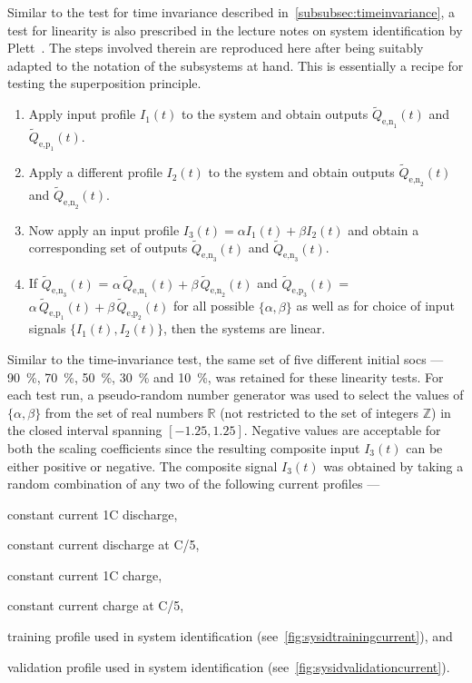 Similar     to      the     test      for     time      invariance     described
in~\cref{subsubsec:timeinvariance}, a  test for linearity is  also prescribed in
the lecture notes on  system identification by Plett~\cite{PlettECE5560_02}. The
steps involved therein  are reproduced here after being suitably  adapted to the
notation of the subsystems at hand. This is essentially a recipe for testing the
superposition principle.
\begin{enumerate}
    \item Apply input profile $I_1(t)$ to the system and obtain outputs $\widetilde{Q}_{\text{e,n}_1}\!(t)$ and $\widetilde{Q}_{\text{e,p}_1}\!(t)$.
    \item Apply a different profile $I_2(t)$ to the system and obtain outputs $\widetilde{Q}_{\text{e,n}_2}\!(t)$ and $\widetilde{Q}_{\text{e,n}_2}\!(t)$.
    \item Now apply an input profile $I_3(t) = \alpha I_1(t) + \beta I_2(t)$ and obtain a corresponding set of outputs $\widetilde{Q}_{\text{e,n}_3}\!(t)$ and $\widetilde{Q}_{\text{e,n}_3}\!(t)$.
    \item If $\widetilde{Q}_{\text{e,n}_3}\!(t)$ = $\alpha\, \widetilde{Q}_{\text{e,n}_1}\!(t) + \beta \, \widetilde{Q}_{\text{e,n}_2}\!(t)$ and $\widetilde{Q}_{\text{e,p}_3}\!(t)$ = $\alpha\, \widetilde{Q}_{\text{e,p}_1}\!(t) + \beta \, \widetilde{Q}_{\text{e,p}_2}\!(t)$ for all possible $\{\alpha,\beta\}$ as well as for choice of input signals $\{I_1(t),I_2(t)\}$, then the systems are linear.
\end{enumerate}

Similar  to   the  time-invariance  test,   the  same  set  of   five  different
initial \glspl{soc} --- \SI{90}{\percent}, \SI{70}{\percent}, \SI{50}{\percent},
\SI{30}{\percent} and \SI{10}{\percent}, was retained for these linearity tests.
For  each test  run, a  pseudo-random number  generator was  used to  select the
values  of $\{\alpha,\beta\}$  from the  set of  real numbers  $\mathbb{R}$ (not
restricted to the set of integers  $\mathbb{Z}$) in the closed interval spanning
$[-1.25,1.25]$. Negative values are acceptable for both the scaling coefficients
since the resulting composite input $I_3(t)$ can be either positive or negative.
The composite  signal $I_3(t)$ was  obtained by taking  a random combination of
any two of the following current profiles ---
\begin{enumerate*}[label=\emph{\alph*})]
    \item constant current 1C discharge,
    \item constant current discharge at C/5,
    \item constant current 1C charge,
    \item constant current charge at C/5,
    \item training profile used in system identification (see~\cref{fig:sysidtrainingcurrent}), and
    \item validation profile used in system identification (see~\cref{fig:sysidvalidationcurrent}).
\end{enumerate*}

